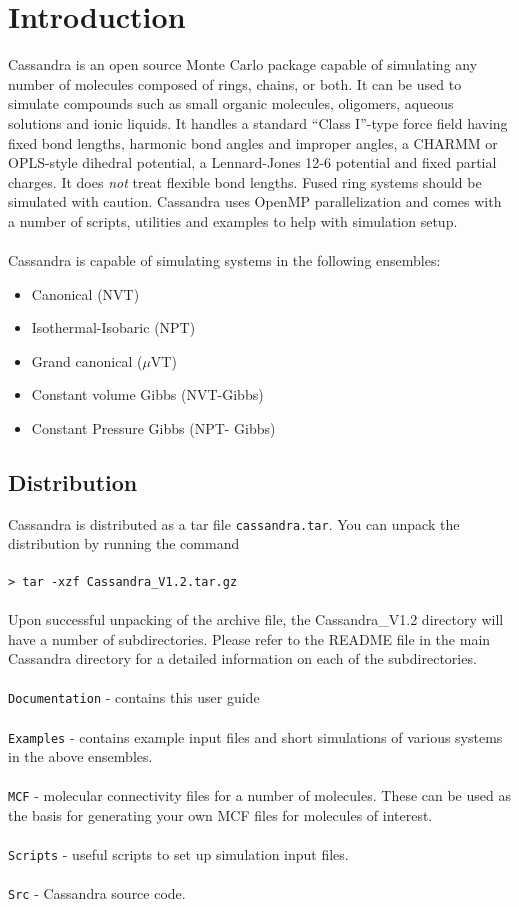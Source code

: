 \chapter{Introduction}
Cassandra is an open source Monte Carlo package capable of simulating
any number of molecules composed of rings, chains, or both. It can be
used to simulate compounds such as small organic molecules, oligomers,
aqueous solutions and ionic liquids. It handles a standard ``Class
I''-type force field having fixed bond lengths, harmonic bond angles
and improper angles, a CHARMM or OPLS-style dihedral potential, a
Lennard-Jones 12-6 potential and fixed partial charges. It does {\em
  not} treat flexible bond lengths. Fused ring systems should
  be simulated with caution. Cassandra uses OpenMP parallelization and comes
with a number of scripts, utilities and examples to help with
simulation setup. \\ \\ 
%
Cassandra is capable of simulating systems in the following ensembles: \\ 
%
\begin{itemize}
\item Canonical (NVT) 
\item Isothermal-Isobaric (NPT) 
\item Grand canonical ($\mu$VT) 
\item Constant volume Gibbs (NVT-Gibbs) 
\item Constant Pressure Gibbs (NPT- Gibbs)
\end{itemize}

\section{Distribution}
Cassandra is distributed as a tar file \texttt{cassandra.tar}. You can unpack the distribution by running the command \\ \\
%
\texttt{> tar -xzf Cassandra\_V1.2.tar.gz} \\ \\
%
Upon successful unpacking of the archive file, the Cassandra\_V1.2 directory will have a number of subdirectories. Please refer to the README file in the main Cassandra directory for a detailed information on each of the subdirectories. \\ \\
%
\texttt{Documentation} - contains this user guide\\ \\
%
\texttt{Examples} - contains example input files and short simulations of various systems in the above ensembles. \\ \\
%
\texttt{MCF} - molecular connectivity files for a number of
molecules. These can be used as the basis for generating your own MCF files for
molecules of interest. \\ \\ 
%
\texttt{Scripts} - useful scripts to set up simulation input files. \\ \\
%
\texttt{Src} - Cassandra source code. \\ \\
